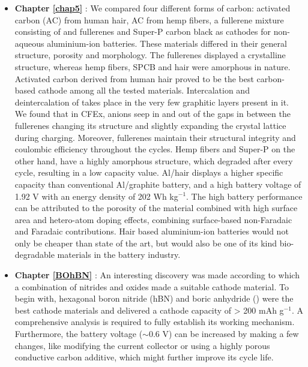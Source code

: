 \begin{itemize}
\item \textbf{Chapter \ref{chap5}} : We compared four different forms of carbon: activated carbon (AC) from human hair, AC from hemp fibers, a fullerene mixture consisting of  and  fullerenes and Super-P carbon black as cathodes for non-aqueous aluminium-ion batteries. These materials differed in their general structure, porosity and morphology. The fullerenes displayed a crystalline structure, whereas hemp fibers, SPCB and hair were amorphous in nature. Activated carbon derived from human hair proved to be the best carbon-based cathode among all the tested materials. Intercalation and deintercalation of  takes place in the very few graphitic layers present in it. We found that in CFEx,  anions seep in and out of the gaps in between the fullerenes changing its structure and slightly expanding the crystal lattice during charging. Moreover, fullerenes maintain their structural integrity and coulombic efficiency throughout the cycles. Hemp fibers and Super-P on the other hand, have a highly amorphous structure, which degraded after every cycle, resulting in a low capacity value. Al/hair displays a higher specific capacity than conventional Al/graphite battery, and a high battery voltage of 1.92 V with an energy density of 202 Wh kg$^{-1}$. The high battery performance can be attributed to the porosity of the material combined with high surface area and hetero-atom doping effects, combining surface-based non-Faradaic and Faradaic contributions. Hair based aluminium-ion batteries would not only be cheaper than state of the art, but would also be one of its kind bio-degradable materials in the battery industry.

\item \textbf{Chapter \ref{BOhBN}} : An interesting discovery was made according to which a combination of nitrides and oxides made a suitable cathode material. To begin with, hexagonal boron nitride (hBN) and boric anhydride () were the best cathode materials and delivered a cathode capacity of > 200 mAh g$^{-1}$. A comprehensive analysis is required to fully establish its working mechanism. Furthermore, the battery voltage ($\sim$0.6 V) can be increased by making a few changes, like modifying the current collector or using a highly porous conductive carbon additive, which might further improve its cycle life. 
\end{itemize}

